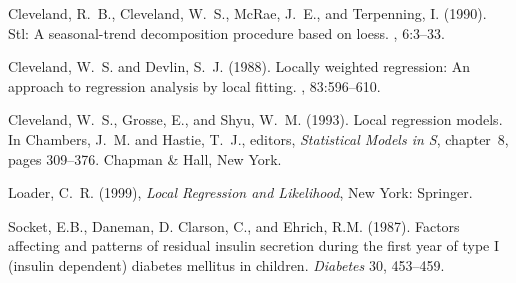 \begin{thebibliography}{}


{Cleveland, R.~B., Cleveland, W.~S., McRae, J.~E., and Terpenning, I.} (1990).
\newblock Stl: {A} seasonal-trend decomposition procedure based on loess.
, 6:3--33.

{Cleveland, W.~S. and Devlin, S.~J.} (1988).
\newblock Locally weighted regression: {A}n approach to regression analysis by
  local fitting.
, 83:596--610.

{Cleveland, W.~S., Grosse, E., and Shyu, W.~M.} (1993).
\newblock Local regression models.
\newblock In {Chambers, J.~M. and Hastie, T.~J.}, editors, {\em Statistical
  Models in {S}}, chapter~8, pages 309--376. Chapman \& Hall, New York.

{Loader, C.~R.}  (1999),
 {\it Local Regression and Likelihood}, New York:
 Springer.

{Socket, E.B., Daneman, D. Clarson, C., and Ehrich,
  R.M.} (1987). Factors affecting and patterns of residual insulin
  secretion during the first year of type I (insulin dependent) diabetes
  mellitus in children. {\it Diabetes} 30, 453--459.

\end{thebibliography}
